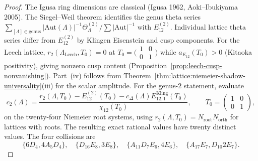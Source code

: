 \begin{proof}
The Igusa ring dimensions are classical
(Igusa 1962, Aoki--Ibukiyama 2005).
The Siegel--Weil theorem identifies the genus theta series
$\sum_{[\Lambda] \in \mathrm{genus}} |\mathrm{Aut}(\Lambda)|^{-1}
\Theta_\Lambda^{(2)} / \sum |\mathrm{Aut}|^{-1}$
with $E_{12}^{(2)}$. Individual lattice theta series differ
from $E_{12}^{(2)}$ by Klingen Eisenstein and cusp components.
For the Leech lattice,
$r_2(\Lambda_{\mathrm{Leech}}, T_0) = 0$ at
$T_0 = \bigl(\begin{smallmatrix} 1 & 0 \\ 0 & 1
\end{smallmatrix}\bigr)$ while
$a_{E_{12}}(T_0) > 0$ (Kitaoka positivity), giving nonzero
cusp content
(Proposition~\ref{prop:leech-cusp-nonvanishing}).
Part~(iv) follows from
Theorem~\ref{thm:lattice:niemeier-shadow-universality}(iii) for the
scalar amplitude.  For the genus-$2$ statement, evaluate
\[
c_2(\Lambda)=\frac{r_2(\Lambda,T_0)-E_{12}^{(2)}(T_0)
-c_\Delta(\Lambda)E_{12,1}^{\mathrm{Kling}}(T_0)}
{\chi_{12}(T_0)},\qquad T_0=\begin{pmatrix}1&0\\0&1\end{pmatrix},
\]
on the twenty-four Niemeier root systems, using
$r_2(\Lambda,T_0)=N_{\mathrm{root}}N_{\mathrm{orth}}$ for lattices
with roots.  The resulting exact rational values have twenty distinct
values.  The four collisions are
\[
\{6D_4,4A_5D_4\},\quad\{D_{16}E_8,3E_8\},\quad
\{A_{11}D_7E_6,4E_6\},\quad\{A_{17}E_7,D_{10}2E_7\}.
\]
\end{proof}

